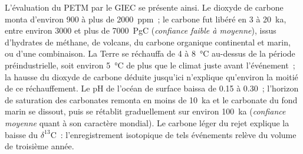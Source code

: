 L'évaluation du PETM par le GIEC se présente ainsi. Le dioxyde de carbone monta d'environ 900 à plus de
\qty{2000}{ppm}~; le carbone fut libéré en 3 à \qty{20}{ka}, entre environ 3000 et plus de
\qty{7000}{PgC} (\emph{confiance faible à moyenne}), issus d'hydrates de méthane, de volcans, du carbone organique
continental et marin, ou d'une combinaison. La Terre se réchauffa de 4 à \qty{8}{\celsius} au-dessus de
la période préindustrielle, soit environ \qty{5}{\celsius} de plus que le climat juste avant l'événement~; la hausse
du dioxyde de carbone déduite jusqu'ici n'explique qu'environ la moitié de ce réchauffement. Le pH de l'océan de surface baissa
de 0.15 à 0.30~; l'horizon de saturation des carbonates remonta en moins de \qty{10}{ka} et le carbonate du fond
marin se dissout, puis se rétablit graduellement sur environ \qty{100}{ka} (\emph{confiance moyenne}
quant à son caractère mondial). Le carbone léger du rejet explique la baisse du $\delta^{13}$C~: l'enregistrement
isotopique de tels événements relève du volume de troisième année.

\begin{omfigure}
\centering
{}
\par{}
\end{omfigure}

